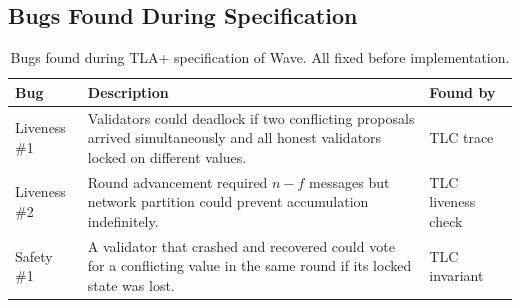 \subsection{Bugs Found During Specification}

\begin{table}[H]
\centering
\small
\begin{tabular}{@{}lp{7cm}l@{}}
\toprule
\textbf{Bug} & \textbf{Description} & \textbf{Found by} \\
\midrule
Liveness \#1 & Validators could deadlock if two conflicting proposals arrived simultaneously and all honest validators locked on different values. & TLC trace \\
Liveness \#2 & Round advancement required $n - f$ messages but network partition could prevent accumulation indefinitely. & TLC liveness check \\
Safety \#1 & A validator that crashed and recovered could vote for a conflicting value in the same round if its locked state was lost. & TLC invariant \\
\bottomrule
\end{tabular}
\caption{Bugs found during TLA+ specification of Wave. All fixed before implementation.}
\end{table}

